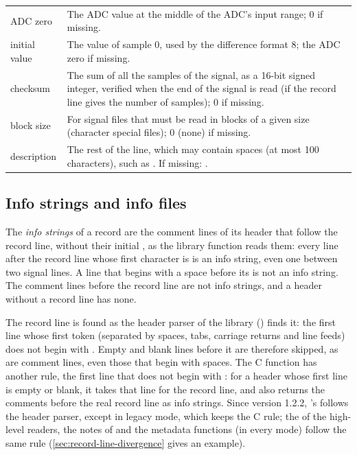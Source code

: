 \begin{table}[htbp]
\begin{tabularx}{\linewidth}{@{}P{3.3cm}L@{}}
ADC zero & The ADC value at the middle of the ADC's input range; 0 if
  missing. \\
initial value & The value of sample 0, used by the difference format 8;
  the ADC zero if missing. \\
checksum & The sum of all the samples of the signal, as a 16-bit signed
  integer, verified when the end of the signal is read (if the record line
  gives the number of samples); 0 if missing. \\
block size & For signal files that must be read in blocks of a given size
  (character special files); 0 (none) if missing. \\
description & The rest of the line, which may contain spaces (at most 100
  characters), such as . If missing:
  . \\
\bottomrule
\end{tabularx}
\end{table}

\subsection{Info strings and info files}
\label{sec:info-strings}

The \emph{info strings} of a record are the comment lines of its header
that follow the record line, without their initial \code{\#}, as the
library function  reads them: every line after the record line
whose first character is \code{\#} is an info string, even one between two
signal lines. A line that begins with a space before its \code{\#} is not
an info string. The comment lines before the record line are not info
strings, and a header without a record line has none.

The record line is found as the header parser of the library
() finds it: the first line whose first token (separated by
spaces, tabs, carriage returns and line feeds) does not begin with
\code{\#}. Empty and blank lines before it are therefore skipped, as are
comment lines, even those that begin with spaces. The C function
 has another rule, the first line that does not begin with
\code{\#}: for a header whose first line is empty or blank, it takes that
line for the record line, and also returns the comments before the real
record line as info strings. Since version 1.2.2, \wfdbx{}'s 
follows the header parser, except in legacy mode, which keeps the C rule;
the  of the high-level readers, the notes of 
and the metadata functions (in every mode) follow the same rule
(\cref{sec:record-line-divergence} gives an example).

